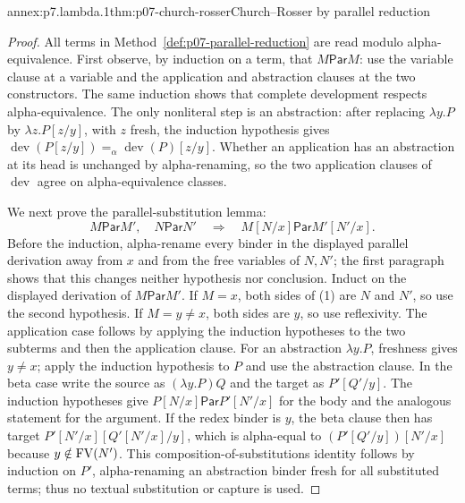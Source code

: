 
\begin{annexitem}{annex:p7.lambda.1}{thm:p07-church-rosser}{Church--Rosser by parallel reduction}
\begin{proof}
All terms in Method~\ref{def:p07-parallel-reduction} are read modulo
alpha-equivalence.  First observe, by induction on a term, that
\(M\mathrel{\mathsf{Par}}M\): use the variable clause at a variable and the
application and abstraction clauses at the two constructors.  The same
induction shows that complete development respects alpha-equivalence.  The
only nonliteral step is an abstraction: after replacing
\(\lambda y.P\) by \(\lambda z.P[z/y]\), with \(z\) fresh, the induction
hypothesis gives
\(\operatorname{dev}(P[z/y])=_{\alpha}
  \operatorname{dev}(P)[z/y]\).  Whether an application has an abstraction at
its head is unchanged by alpha-renaming, so the two application clauses of
\(\operatorname{dev}\) agree on alpha-equivalence classes.

We next prove the parallel-substitution lemma:
\[
 M\mathrel{\mathsf{Par}}M',\quad
 N\mathrel{\mathsf{Par}}N'
 \quad\Longrightarrow\quad
 M[N/x]\mathrel{\mathsf{Par}}M'[N'/x].                 \tag{1}
\]
Before the induction, alpha-rename every binder in the displayed parallel
derivation away from \(x\) and from the free variables of \(N,N'\); the first
paragraph shows that this changes neither hypothesis nor conclusion.  Induct on the displayed derivation of
\(M\mathrel{\mathsf{Par}}M'\).  If \(M=x\), both sides of (1) are
\(N\) and \(N'\), so use the second hypothesis.  If \(M=y\ne x\), both
sides are \(y\), so use reflexivity.  The application case follows by applying
the induction hypotheses to the two subterms and then the application clause.
For an abstraction \(\lambda y.P\), freshness gives \(y\ne x\); apply the
induction hypothesis to \(P\) and use the abstraction clause.  In the beta
case write the source as \((\lambda y.P)Q\) and the target as
\(P'[Q'/y]\).  The induction hypotheses give
\(P[N/x]\mathrel{\mathsf{Par}}P'[N'/x]\) for the body and the analogous
statement for the argument.  If the redex binder is \(y\), the beta clause
then has target
\(P'[N'/x][Q'[N'/x]/y]\), which is alpha-equal to
\((P'[Q'/y])[N'/x]\) because \(y\notin\operatorname{FV}(N')\).  This
composition-of-substitutions identity follows by induction on \(P'\),
alpha-renaming an abstraction binder fresh for all substituted terms; thus no
textual substitution or capture is used.


\end{proof}
\end{annexitem}
